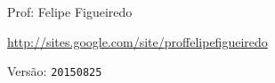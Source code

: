 \documentclass[a4paper]{article}
\begin{document}
\parbox[c]{.825\textwidth}{\raggedright%
{Prof: Felipe Figueiredo\par}
{\url{http://sites.google.com/site/proffelipefigueiredo}\par}
}

Versão: \verb|20150825|



\end{document}
